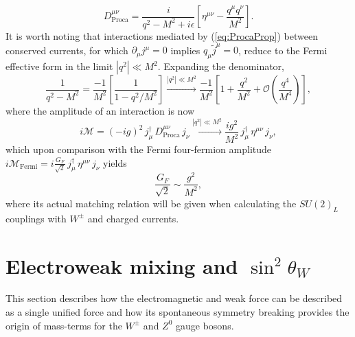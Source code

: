 \begin{equation}\label{eq:ProcaProp}
  D^{\mu \nu}_{\text{Proca}} = \frac{i}{q^2 - M^2 + i\epsilon}\left[ \eta^{\mu \nu} - \frac{q^\mu q^\nu}{M^2}\right].
\end{equation}
It is worth noting that interactions mediated by (\ref{eq:ProcaProp}) between conserved currents, for which $\partial_\mu j^\mu = 0$ implies $q_\mu\widetilde{j}^\mu = 0$, reduce to the Fermi effective form in the limit $|q^2| \ll M^2$. Expanding the denominator,
\begin{equation}\label{eq:lowlimitprocaprop}
  \frac{1}{q^2 - M^2} = 
  \frac{-1}{M^2}\left[\frac{1}{1 - q^2/M^2}\right]
  \xrightarrow{|q^2|\ll M^2} 
  \frac{-1}{M^2}\left[1 + \frac{q^2}{M^2} 
  + \mathcal{O}\!\left(\frac{q^4}{M^4}\right)\right],
\end{equation}
where the amplitude of an interaction is now
\begin{equation}
  i\mathcal{M} = (-ig)^2\,j^\dagger_\mu\,D^{\mu\nu}_{\text{Proca}}
  \,j_\nu \xrightarrow{|q^2|\ll M^2} 
  \frac{ig^2}{M^2}\,j^\dagger_\mu\,\eta^{\mu\nu}\,j_\nu,
\end{equation}
which upon comparison with the Fermi four-fermion amplitude 
$i\mathcal{M}_{\text{Fermi}} = i\frac{G_F}{\sqrt{2}}\,
j^\dagger_\mu\,\eta^{\mu\nu}\,j_\nu$ yields
\begin{equation}\label{eq:GF_matching}
  \frac{G_F}{\sqrt{2}} \sim \frac{g^2}{M^2},
\end{equation}
where its actual matching relation will be given when calculating the $SU(2)_L$ couplings with $W^{\pm}$ and charged currents.
\section{Electroweak mixing and $\sin^2 \theta_W$}
This section describes how the electromagnetic and weak force can be described as a single unified force and how its spontaneous symmetry breaking provides the origin of mass-terms for the $W^\pm$ and $Z^0$ gauge bosons.
